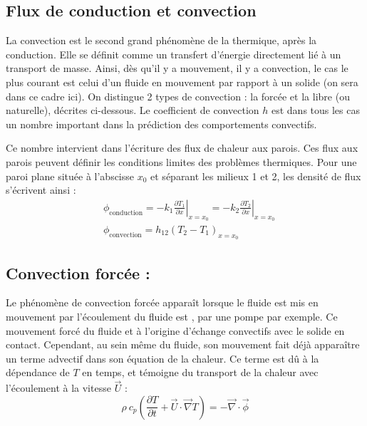 

\subsection{Flux de conduction et convection}
La convection est le second grand phénomène de la thermique, après la conduction. Elle se définit comme un transfert d'énergie directement lié à un transport de masse. Ainsi, dès qu'il y a mouvement, il y a convection, le cas le plus courant est celui d'un fluide en mouvement par rapport à un solide (on sera dans ce cadre ici). On distingue 2 types de convection : la forcée et la libre (ou naturelle), décrites ci-dessous. Le coefficient de convection $h$ est dans tous les cas un nombre important dans la prédiction des comportements convectifs.

Ce nombre intervient dans l'écriture des flux de chaleur aux parois. Ces flux aux parois peuvent définir les conditions limites des problèmes thermiques. Pour une paroi plane située à l'abscisse $x_0$ et séparant les milieux 1 et 2, les densité de flux s'écrivent ainsi :
%
\begin{align}[left=\empheqlbrace]
 &\phi_{\text{conduction}}
 = - k_1 \left. \frac{\partial{T_1}}{\partial{x}} \right|_{x=x_0}
 = - k_2 \left. \frac{\partial{T_2}}{\partial{x}} \right|_{x=x_0} \\
 &\phi_{\text{convection}}
 = h_{12} \left( T_2 - T_1 \right)_{x=x_0}
 \label{eq:fluxth}
\end{align}


\subsection{Convection forcée :}
Le phénomène de convection forcée apparaît lorsque le fluide est mis en mouvement par
l'écoulement du fluide est , par une pompe par exemple. Ce mouvement forcé du fluide et à l'origine d'échange convectifs avec le solide en contact. Cependant, au sein même du fluide, son mouvement fait déjà apparaître un terme advectif dans son équation de la chaleur. Ce terme est dû à la dépendance de $T$ en temps, et témoigne du transport de la chaleur avec l'écoulement à la vitesse $\vec{U}$ :
%
\begin{equation}
\rho~c_{p} \left( \frac{\partial T}{\partial t}
+ \vec{U} \cdot \vec{\nabla} T \right)
= - \vec{\nabla} \cdot \vec{\phi}
\end{equation}

